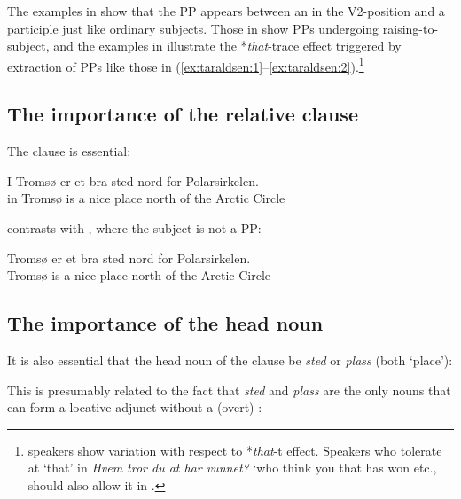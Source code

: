\documentclass[output=paper]{LSP/langsci}
\begin{document}
The examples in  show that the PP appears between an  in the V2-position and a participle just like ordinary subjects. Those in  show PPs undergoing raising-to-subject, and the examples in  illustrate the *\textit{that}-trace effect triggered by extraction of PPs like those in (\ref{ex:taraldsen:1}--\ref{ex:taraldsen:2}).\footnote{ speakers show variation with respect to *\textit{that}-t effect. Speakers who tolerate at ‘that’ in \textit{Hvem tror du at har vunnet?} ‘who think you that has won etc., should also allow it in .}

\subsection{The importance of the relative clause}\label{sec:taraldsen:2.2}

The  clause is essential:

\ea%
    \label{ex:taraldsen:8}
    \gll *  I Tromsø er et bra sted nord for Polarsirkelen.\\
	 {} in Tromsø is a nice place north of {the Arctic Circle}\\
\z

\noindent{} contrasts with , where the subject is not a PP:

\ea%
    \label{ex:taraldsen:9}
    \gll Tromsø er et bra sted nord for Polarsirkelen.\\
	 Tromsø is a nice place north of {the Arctic Circle}\\
\z

\subsection{The importance of the head noun}\label{sec:taraldsen:2.3}

It is also essential that the head noun of the  clause be \textit{sted} or \textit{plass} (both `place'):

\ea%
    \label{ex:taraldsen:10}
    \z
\z
This is presumably related to the fact that \textit{sted} and \textit{plass} are the only nouns that can form a locative adjunct without a (overt) :
\end{document}
